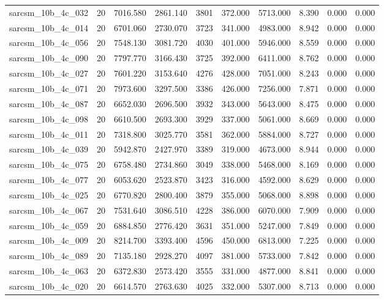 \begin{tabular}{lrrrrrrrrr}
sarcsm\_10b\_4c\_032 & 20 & 7016.580 & 2861.140 & 3801 & 372.000 & 5713.000 & 8.390 & 0.000 & 0.000 \\
sarcsm\_10b\_4c\_014 & 20 & 6701.060 & 2730.070 & 3723 & 341.000 & 4983.000 & 8.942 & 0.000 & 0.000 \\
sarcsm\_10b\_4c\_056 & 20 & 7548.130 & 3081.720 & 4030 & 401.000 & 5946.000 & 8.559 & 0.000 & 0.000 \\
sarcsm\_10b\_4c\_090 & 20 & 7797.770 & 3166.430 & 3725 & 392.000 & 6411.000 & 8.762 & 0.000 & 0.000 \\
sarcsm\_10b\_4c\_027 & 20 & 7601.220 & 3153.640 & 4276 & 428.000 & 7051.000 & 8.243 & 0.000 & 0.000 \\
sarcsm\_10b\_4c\_071 & 20 & 7973.600 & 3297.500 & 3386 & 426.000 & 7256.000 & 7.871 & 0.000 & 0.000 \\
sarcsm\_10b\_4c\_087 & 20 & 6652.030 & 2696.500 & 3932 & 343.000 & 5643.000 & 8.475 & 0.000 & 0.000 \\
sarcsm\_10b\_4c\_098 & 20 & 6610.500 & 2693.300 & 3929 & 337.000 & 5061.000 & 8.669 & 0.000 & 0.000 \\
sarcsm\_10b\_4c\_011 & 20 & 7318.800 & 3025.770 & 3581 & 362.000 & 5884.000 & 8.727 & 0.000 & 0.000 \\
sarcsm\_10b\_4c\_039 & 20 & 5942.870 & 2427.970 & 3389 & 319.000 & 4673.000 & 8.944 & 0.000 & 0.000 \\
sarcsm\_10b\_4c\_075 & 20 & 6758.480 & 2734.860 & 3049 & 338.000 & 5468.000 & 8.169 & 0.000 & 0.000 \\
sarcsm\_10b\_4c\_077 & 20 & 6053.620 & 2523.870 & 3423 & 316.000 & 4592.000 & 8.629 & 0.000 & 0.000 \\
sarcsm\_10b\_4c\_025 & 20 & 6770.820 & 2800.400 & 3879 & 355.000 & 5068.000 & 8.898 & 0.000 & 0.000 \\
sarcsm\_10b\_4c\_067 & 20 & 7531.640 & 3086.510 & 4228 & 386.000 & 6070.000 & 7.909 & 0.000 & 0.000 \\
sarcsm\_10b\_4c\_059 & 20 & 6884.850 & 2776.420 & 3631 & 351.000 & 5247.000 & 7.849 & 0.000 & 0.000 \\
sarcsm\_10b\_4c\_009 & 20 & 8214.700 & 3393.400 & 4596 & 450.000 & 6813.000 & 7.225 & 0.000 & 0.000 \\
sarcsm\_10b\_4c\_089 & 20 & 7135.180 & 2928.270 & 4097 & 381.000 & 5733.000 & 7.842 & 0.000 & 0.000 \\
sarcsm\_10b\_4c\_063 & 20 & 6372.830 & 2573.420 & 3555 & 331.000 & 4877.000 & 8.841 & 0.000 & 0.000 \\
sarcsm\_10b\_4c\_020 & 20 & 6614.570 & 2763.630 & 4025 & 332.000 & 5307.000 & 8.713 & 0.000 & 0.000 \\

\end{tabular}
